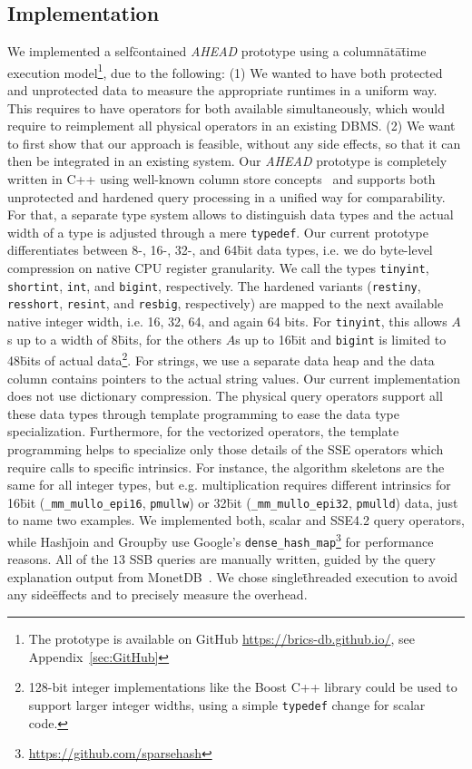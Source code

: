 \subsection{Implementation}
\label{sec:Implementation}
We implemented a self\=contained \emph{AHEAD} prototype using a column\=at\=a\=time execution model\footnote{The prototype is available on GitHub \url{https://brics-db.github.io/}, see Appendix~\ref{sec:GitHub}}, due to the following: (1) We wanted to have both protected and unprotected data to measure the appropriate runtimes in a uniform way. This requires to have operators for both available simultaneously, which would require to reimplement all physical operators in an existing DBMS. (2) We want to first show that our approach is feasible, without any side effects, so that it can then be integrated in an existing system. Our \emph{AHEAD} prototype is completely written in C++ using well-known column store concepts~\cite{DBLP:journals/ftdb/AbadiBHIM13} and supports both unprotected and hardened query processing in a unified way for comparability. For that, a separate type system allows to distinguish data types and the actual width of a type is adjusted through a mere \texttt{typedef}. Our current prototype differentiates between 8-, 16-, 32-, and 64\=bit data types, i.e. we do byte-level compression on native CPU register granularity. We call the types \texttt{tinyint}, \texttt{shortint}, \texttt{int}, and \texttt{bigint}, respectively. The hardened variants (\texttt{restiny}, \texttt{resshort}, \texttt{resint}, and \texttt{resbig}, respectively) are mapped to the next available native integer width, i.e. 16, 32, 64, and again 64 bits. For \texttt{tinyint}, this allows \(A\)s up to a width of 8\=bits, for the others \(A\)s up to 16\=bit and \texttt{bigint} is limited to 48\=bits of actual data\footnote{128-bit integer implementations like the Boost C++ library could be used to support larger integer widths, using a simple \texttt{typedef} change for scalar code.}. For strings, we use a separate data heap and the data column contains pointers to the actual string values. Our current implementation does not use dictionary compression. The physical query operators support all these data types through template programming to ease the data type specialization. Furthermore, for the vectorized operators, the template programming helps to specialize only those details of the SSE operators which require calls to specific intrinsics. For instance, the algorithm skeletons are the same for all integer types, but e.g. multiplication requires different intrinsics for 16\=bit (\texttt{\_mm\_mullo\_epi16}, \texttt{pmullw}) or 32\=bit (\texttt{\_mm\_mullo\_epi32}, \texttt{pmulld}) data, just to name two examples. We implemented both, scalar and SSE4.2 query operators, while Hash\=join and Group\=by use Google's \texttt{dense\_hash\_map}\footnote{\url{https://github.com/sparsehash}} for performance reasons. All of the $13$ SSB queries are manually written, guided by the query explanation output from MonetDB~\cite{boncz2002monet}. We chose single\=threaded execution to avoid any side\=effects and to precisely measure the overhead.


